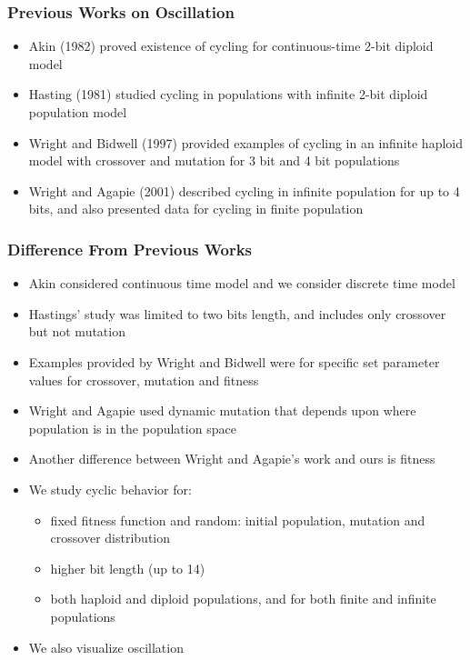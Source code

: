 \documentclass[aspectratio=169]{beamer}
\begin{document}
  \begin{frame}
    \frametitle{Previous Works on Oscillation}
    \begin{itemize}
      \item{Akin (1982) proved existence of cycling for continuous-time 2-bit diploid model}  
      \item{Hasting (1981) studied cycling in populations with infinite 2-bit diploid population model}
      \item{Wright and Bidwell (1997) provided examples of cycling in an infinite haploid model 
      with crossover and mutation for 3 bit and 4 bit populations }
      \item{Wright and Agapie (2001) described cycling in infinite population for up to 4 bits, 
      and also presented data for cycling in finite population}
    \end{itemize}
  \end{frame}
  
  \begin{frame}
    \frametitle{Difference From Previous Works}
    \begin{itemize}
      \item{Akin considered continuous time model and we consider discrete time model}
      \item{Hastings' study was limited to two bits length, and includes only crossover but not mutation}
      \item{Examples provided by Wright and Bidwell were for specific set parameter values for crossover, mutation and fitness }
      \item{Wright and Agapie used dynamic mutation that depends upon where population is in the population space}
      \item{Another difference between Wright and Agapie's work and ours is fitness}
      \item{We study cyclic behavior for:}      
      \begin{itemize}
	\item{fixed fitness function and random: initial population, mutation and crossover distribution}
	\item{higher bit length (up to 14)}
	\item{both haploid and diploid populations, and for both finite and infinite populations}
      \end{itemize}
      \item{We also visualize oscillation}
    \end{itemize}
  \end{frame}
  
\end{document}
